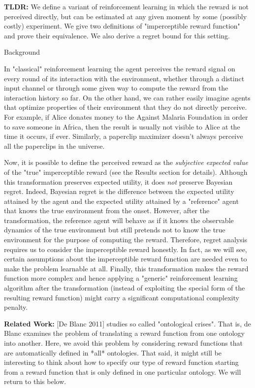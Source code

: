 \documentclass[a4paper]{article}
\newcommand{\Co}[1]{}
\newcommand{\San}[1]{}
\begin{document}
\textbf{TLDR:}\Co{b} We define a variant of reinforcement learning in which the reward is not perceived directly, but can be estimated at any given moment by some (possibly costly) experiment. We give two definitions of  "imperceptible reward function" and prove their equivalence. We also derive a regret bound for this setting.

\begin{Huge}Background\end{Huge}

In "classical" reinforcement learning the agent perceives the reward signal on every round of its interaction with the environment, whether through a distinct input channel or through some given way to compute the reward from the interaction history so far. On the other hand, we can rather easily imagine agents that optimize properties of their environment that they do not directly perceive. For example, if Alice donates money to the Against Malaria Foundation in order to save someone in Africa, then the result is usually not visible to Alice at the time it occurs, if ever. Similarly, a paperclip maximizer doesn't always perceive all the paperclips in the universe.

Now, it is possible to define the perceived reward as the \textit{subjective expected value}\Co{i} of the "true" imperceptible reward (see the Results section for details). Although this transformation preserves expected utility, it does \textit{not} preserve Bayesian regret. Indeed, Bayesian regret is the difference between the expected utility attained by the agent and the expected utility attained by a "reference" agent that knows the true environment from the onset. However, after the transformation, the reference agent will behave as if it knows the observable dynamics of the true environment but still pretends not to know the true environment for the purpose of computing the reward. Therefore, regret analysis requires us to consider the imperceptible reward honestly. In fact, as we will see, certain assumptions about the imperceptible reward function are needed even to make the problem learnable at all. Finally, this transformation makes the reward function more complex and hence applying a "generic" reinforcement learning algorithm after the transformation (instead of exploiting the special form of the resulting reward function) might carry a significant computational complexity penalty.

\textbf{Related Work:}\Co{b} [De Blanc 2011]\San{(https://arxiv.org/abs/1105.3821)}\Co{s} studies so called "ontological crises". That is, de Blanc examines the problem of translating a reward function from one ontology into another. Here, we avoid this problem by considering reward functions that are automatically defined in *all* ontologies. That said, it might still be interesting to think about how to specify our type of reward function starting from a reward function that is only defined in one particular ontology. We will return to this below.
\end{document}
